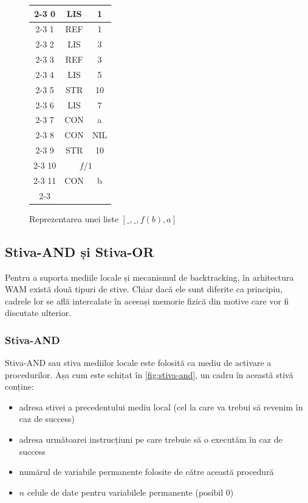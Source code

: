 \documentclass[12pt,a4paper,twoside]{report}
\begin{document}
\begin{figure}
\begin{center}
\begin{tabular}{c|c|c|}
\cline{2-3}
0 &LIS & 1 \\
\cline{2-3}
1 & REF & 1 \\
\cline{2-3}
2 & LIS & 3 \\
\cline{2-3}
3 & REF & 3 \\
\cline{2-3}
4 & LIS & 5 \\
\cline{2-3}
5 & STR & 10\\
\cline{2-3}
6 & LIS & 7 \\
\cline{2-3}
7 & CON & a \\
\cline{2-3}
8 & CON & NIL \\
\cline{2-3}
9 & STR & 10 \\
\cline{2-3}
10 & \multicolumn{2}{|c|}{\(f/1\)} \\
\cline{2-3}
11 & CON & b \\
\cline{2-3}
\end{tabular}
\end{center}
\caption{Reprezentarea unei liste \([\_, \_, f(b), a]\)} \label{repr:termen2}
\end{figure}

\subsection{Stiva-AND și Stiva-OR}
Pentru a suporta mediile locale și mecanismul de backtracking, în arhitectura WAM există două tipuri de stive. Chiar dacă ele sunt diferite ca principiu, cadrele lor se află intercalate în aceeași memorie fizică din motive care vor fi discutate ulterior.
\subsubsection{Stiva-AND}
Stiva-AND sau stiva mediilor locale este folosită ca mediu de activare a procedurilor. Așa cum este schițat în \ref{fig:stiva-and}, un cadru în această stivă conține:
\begin{itemize}
\item adresa stivei a precedentului mediu local (cel la care va trebui să revenim în caz de success)
\item adresa următoarei instrucțiuni pe care trebuie să o executăm în caz de success
\item numărul de variabile permanente folosite de către această procedură
\item $n$ celule de date pentru variabilele permanente (posibil 0)
\end{itemize}
\end{document}
